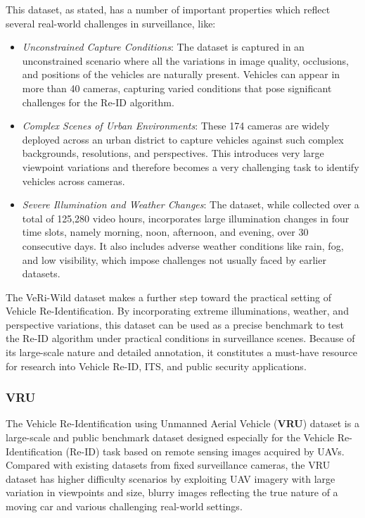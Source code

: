 This dataset, as stated, has a number of important properties which reflect several real-world challenges in surveillance, like:
\begin{itemize}
    \item \textit{Unconstrained Capture Conditions}: The dataset is captured in an unconstrained scenario where all the variations in image quality, occlusions, and positions of the vehicles are naturally present. Vehicles can appear in more than 40 cameras, capturing varied conditions that pose significant challenges for the Re-ID algorithm.
    \item \textit{Complex Scenes of Urban Environments}: These 174 cameras are widely deployed across an urban district to capture vehicles against such complex backgrounds, resolutions, and perspectives. This introduces very large viewpoint variations and therefore becomes a very challenging task to identify vehicles across cameras.
    \item \textit{Severe Illumination and Weather Changes}: The dataset, while collected over a total of 125,280 video hours, incorporates large illumination changes in four time slots, namely morning, noon, afternoon, and evening, over 30 consecutive days. It also includes adverse weather conditions like rain, fog, and low visibility, which impose challenges not usually faced by earlier datasets.
\end{itemize}

The VeRi-Wild dataset makes a further step toward the practical setting of Vehicle Re-Identification. By incorporating extreme illuminations, weather, and perspective variations, this dataset can be used as a precise benchmark to test the Re-ID algorithm under practical conditions in surveillance scenes. Because of its large-scale nature and detailed annotation, it constitutes a must-have resource for research into Vehicle Re-ID, ITS, and public security applications.

\subsubsection{VRU}
The Vehicle Re-Identification using Unmanned Aerial Vehicle (\textbf{VRU}) dataset is a large-scale and public benchmark dataset designed especially for the Vehicle Re-Identification (Re-ID) task based on remote sensing images acquired by UAVs. Compared with existing datasets from fixed surveillance cameras, the VRU dataset has higher difficulty scenarios by exploiting UAV imagery with large variation in viewpoints and size, blurry images reflecting the true nature of a moving car and various challenging real-world settings.

